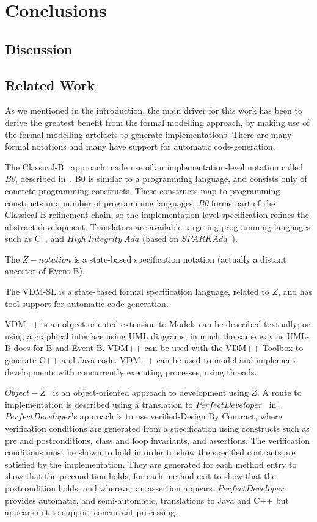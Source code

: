 \section{Conclusions}
\subsection{Discussion}

\subsection{Related Work}
As we mentioned in the introduction, the main driver for this work has been to derive the greatest benefit from the formal modelling approach, by making use of the formal modelling artefacts to generate implementations. There are many formal notations and many have support for automatic code-generation.

The Classical-B~\cite{TheBBook} approach made use of an implementation-level notation called \emph{B0}, described in~\cite{B0RefMan}. B0 is similar to a programming language, and consists only of concrete programming constructs. These constructs map to programming constructs in a number of programming languages. \emph{B0} forms part of the Classical-B refinement chain, so the implementation-level specification refines the abstract development. Translators are available targeting programming languages such as C~\cite{KernighanR88}, and $High~ Integrity~ Ada$ (based on $SPARKAda$~\cite{SPARKAda}). 

The $Z-notation$ is a state-based specification notation (actually a distant ancestor of Event-B).  

The VDM-SL is a state-based formal specification language, related to $Z$, and has tool support for automatic code generation. 

VDM++ is an object-oriented extension to Models can be described textually; or using a graphical interface using UML diagrams, in much the same way as UML-B does for B and Event-B. VDM++ can be used with the VDM++ Toolbox to generate C++ and Java code. VDM++ can be used to model and implement developments with concurrently executing processes, using threads.

$Object-Z$~\cite{GSmith2000} is an object-oriented approach to development using $Z$. A route to implementation is described using a translation to $PerfectDeveloper$~\cite{PD} in~\cite{Stevens06}. $PerfectDeveloper$'s approach is to use verified-Design By Contract, where verification conditions are generated from a specification using constructs such as pre and postconditions, class and loop invariants, and assertions. The verification conditions must be shown to hold in order to show the specified contracts are satisfied by the implementation. They are generated for each method entry to show that the precondition holds, for each method exit to show that the postcondition holds, and wherever an assertion appears. $PerfectDeveloper$ provides automatic, and semi-automatic, translations to Java and C++ but appears not to support concurrent processing.

